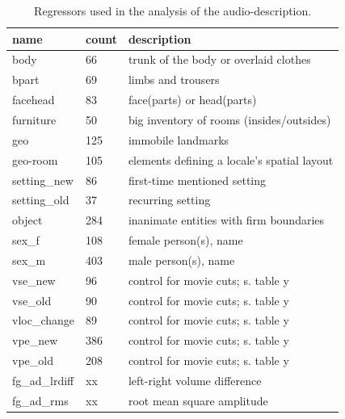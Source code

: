 \documentclass[english]{article}
\begin{document}
\begin{table}
\caption{Regressors used in the analysis of the audio-description. }
\begin{tabular}{lll}
\toprule
\textbf{name} & \textbf{count} & \textbf{description} \\
\midrule
body & 66 & trunk of the body or overlaid clothes \\ 
bpart & 69 & limbs and trousers \\ 
facehead & 83 & face(parts) or head(parts) \\
furniture & 50 & big inventory of rooms (insides/outsides) \\
geo & 125 & immobile landmarks \\ 
geo-room & 105 & elements defining a locale's spatial layout \\ 
setting\_new & 86 & first-time mentioned setting \\ 
setting\_old & 37 & recurring setting \\ 
object & 284 & inanimate entities with firm boundaries \\ 
sex\_f & 108 & female person(s), name \\ 
sex\_m & 403 & male person(s), name \\ 
vse\_new & 96 & control for movie cuts; s. table y \\
vse\_old & 90 & control for movie cuts; s. table y \\
vloc\_change & 89 & control for movie cuts; s. table y \\
vpe\_new & 386 & control for movie cuts; s. table y \\
vpe\_old & 208 & control for movie cuts; s. table y \\
fg\_ad\_lrdiff & xx &  left-right volume difference \\
fg\_ad\_rms & xx & root mean square amplitude \\ 
\bottomrule
\end{tabular}
\end{table}
\end{document}
